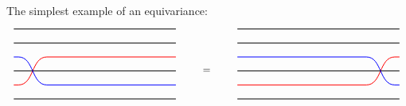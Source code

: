 The simplest example of an equivariance:
\begin{equation}
\begin{tikzpicture}[every path/.style={thick}]
\node[] (x0) at (-3, 0) {};
\node[] (x1) at (-3, 0.5) {};
\node[] (1i) at (-2.7, 0.5) {};
\node[] (1j) at (-1.7, 0.5) {};
\node[] (x2) at (-3, 1) {};
\node[] (x3) at (-3, 1.5) {};
\node[] (3i) at (-2.7, 1.5) {};
\node[] (3j) at (-1.7, 1.5) {};
\node[] (x4) at (-3, 2) {};
\node[] (x5) at (-3, 2.5) {};
\node[] (y0) at (3, 0) {};
\node[] (y1) at (3, 0.5) {};
\node[] (y2) at (3, 1) {};
\node[] (y3) at (3, 1.5) {};
\node[] (y4) at (3, 2) {};
\node[] (y5) at (3, 2.5) {};
\draw (x0) to (y0);
\draw[red] (x1) to (1i.center);
    \draw[red] (1i.center) to[out=0,in=-180] (3j.center);
    \draw[red] (3j.center) to (y3);
\draw (x2) to (y2);
\draw[blue] (x3) to (3i.center);
    \draw[blue] (3i.center) to[out=0,in=-180] (1j.center);
    \draw[blue] (1j.center) to (y1);
\draw (x4) to (y4);
\draw (x5) to (y5);
\end{tikzpicture}
\qquad \raisebox{3em}{=} \qquad
\begin{tikzpicture}[every path/.style={thick}]
\node[] (x0) at (-3, 0) {};
\node[] (x1) at (-3, 0.5) {};
\node[] (1i) at (1.7, 0.5) {};
\node[] (1j) at (2.7, 0.5) {};
\node[] (x2) at (-3, 1) {};
\node[] (x3) at (-3, 1.5) {};
\node[] (3i) at (1.7, 1.5) {};
\node[] (3j) at (2.7, 1.5) {};
\node[] (x4) at (-3, 2) {};
\node[] (x5) at (-3, 2.5) {};
\node[] (y0) at (3, 0) {};
\node[] (y1) at (3, 0.5) {};
\node[] (y2) at (3, 1) {};
\node[] (y3) at (3, 1.5) {};
\node[] (y4) at (3, 2) {};
\node[] (y5) at (3, 2.5) {};
\draw (x0) to (y0);
\draw[red] (x1) to (1i.center);
	\draw[red] (1i.center) to[out=0,in=-180] (3j.center);
	\draw[red] (3j.center) to (y3);
\draw (x2) to (y2);
\draw[blue] (x3) to (3i.center);
	\draw[blue] (3i.center) to[out=0,in=-180] (1j.center);
	\draw[blue] (1j.center) to (y1);
\draw (x4) to (y4);
\draw (x5) to (y5);
\end{tikzpicture}
\end{equation}